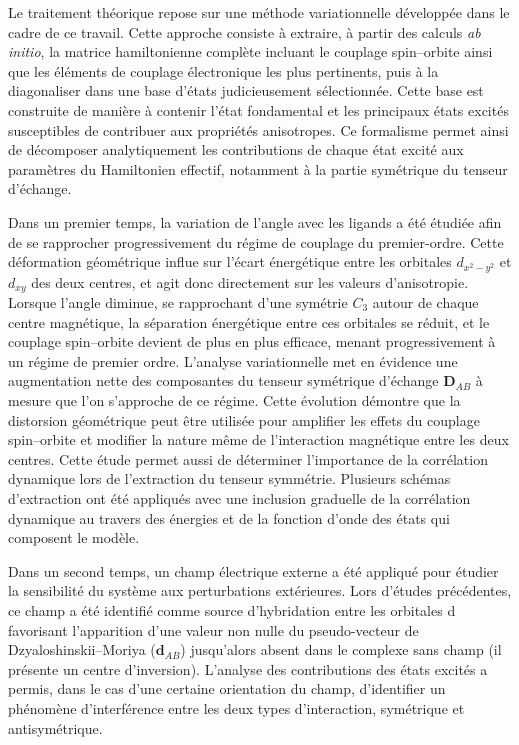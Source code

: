 \documentclass[12pt,a4paper]{report}
\numberwithin{equation}{section}
\begin{document}
Le traitement théorique repose sur une méthode variationnelle développée dans le cadre de ce travail. 
Cette approche consiste à extraire, à partir des calculs \textit{ab initio}, la matrice hamiltonienne complète incluant le couplage spin–orbite ainsi que les éléments de couplage électronique les plus pertinents, puis à la diagonaliser dans une base d’états judicieusement sélectionnée. 
Cette base est construite de manière à contenir l'état fondamental et les principaux états excités susceptibles de contribuer aux propriétés anisotropes. 
Ce formalisme permet ainsi de décomposer analytiquement les contributions de chaque état excité aux paramètres du Hamiltonien effectif, notamment à la partie symétrique du tenseur d’échange. 

Dans un premier temps, la variation de l’angle avec les ligands a été étudiée afin de se rapprocher progressivement du régime de couplage du premier-ordre. 
Cette déformation géométrique influe sur l'écart énergétique entre les orbitales \(d_{x^2-y^2}\) et \(d_{xy}\) des deux centres, et agit donc directement sur les valeurs d'anisotropie. 
Lorsque l’angle diminue, se rapprochant d'une symétrie $C_3$ autour de chaque centre magnétique, la séparation énergétique entre ces orbitales se réduit, et le couplage spin–orbite devient de plus en plus efficace, menant progressivement à un régime de premier ordre. 
L’analyse variationnelle met en évidence une augmentation nette des composantes du tenseur symétrique d’échange \(\mathbf{D}_{AB}\) à mesure que l’on s’approche de ce régime.
Cette évolution démontre que la distorsion géométrique peut être utilisée pour amplifier les effets du couplage spin–orbite et modifier la nature même de l’interaction magnétique entre les deux centres.
Cette étude permet aussi de déterminer l'importance de la corrélation dynamique lors de l'extraction du tenseur symmétrie.
Plusieurs schémas d'extraction ont été appliqués avec une inclusion graduelle de la corrélation dynamique au travers des énergies et de la fonction d'onde des états qui composent le modèle.

Dans un second temps, un champ électrique externe a été appliqué pour étudier la sensibilité du système aux perturbations extérieures. 
Lors d'études précédentes, ce champ a été identifié comme source d'hybridation entre les orbitales d favorisant l'apparition d'une valeur non nulle du pseudo-vecteur de Dzyaloshinskii–Moriya (\(\mathbf{d}_{AB}\)) jusqu'alors absent dans le complexe sans champ (il présente un centre d'inversion).
L'analyse des contributions des états excités a permis, dans le cas d'une certaine orientation du champ, d'identifier un phénomène d'interférence entre les deux types d'interaction, symétrique et antisymétrique.
\end{document}
